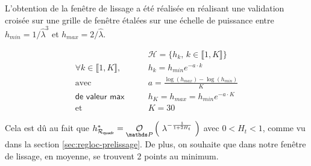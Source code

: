 L'obtention de la fenêtre de lissage a été réalisée en réalisant une validation croisée sur une grille de fenêtre étalées sur une échelle de puissance entre $h_{min} = 1 / \widehat \lambda^3$ et $h_{max} = 2 / \widehat \lambda$.

\begin{align*}
	                                                 & \mathcal H = \bigl\{ h_k, \, k \in \llbracket 1, K \rrbracket \bigr\}
	\\
	\forall k \in \llbracket 1, K \rrbracket, \qquad & h_k = h_{min} e^{ - a \cdot k }
	\\
	\text{avec } \qquad                              & a = \frac{\log \left( h_{max} \right) - \log(h_{min})}{K}
	\\
	\textsf{de valeur max} \qquad                    & h_K = h_{max} = h_{min} e^{ - a \cdot K }
	\\
	\text{et } \qquad                                & K = 30
\end{align*}

Cela est dû au fait que $h^*_{\mathcal R_{\textsf{quadr}}} = \grandop{ \lambda^{- \frac 1 {1 + 2H_t}} }$ avec $0<H_t<1$, comme vu dans la section \ref{sec:regloc-prelissage}. De plus, on souhaite que dans notre fenêtre de lissage, en moyenne, se trouvent 2 points au minimum. 

